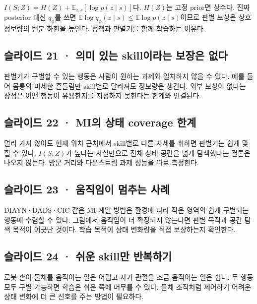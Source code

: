 \documentclass[11pt,a4paper]{article}
\begin{document}
$I(S;Z)=H(Z)+\mathbb E_{z,s}[\log p(z\mid s)]$다. $H(Z)$는 고정 prior면 상수다. 진짜 posterior 대신 $q_\phi$를 쓰면 $\mathbb E\log q_\phi(z\mid s)\le\mathbb E\log p(z\mid s)$이므로 판별 보상은 상호정보량의 변분 하한을 높인다. 정책과 판별기를 함께 학습하는 이유다.\par

\subsection{슬라이드 21 · 의미 있는 skill이라는 보장은 없다}

판별기가 구별할 수 있는 행동은 사람이 원하는 과제와 일치하지 않을 수 있다. 예를 들어 몸통의 미세한 흔들림만 skill별로 달라져도 정보량은 생긴다. 외부 보상이 없다는 장점은 어떤 행동이 유용한지를 지정하지 못한다는 한계와 연결된다.\par

\subsection{슬라이드 22 · MI의 상태 coverage 한계}

멀리 가지 않아도 현재 위치 근처에서 skill별로 다른 자세를 취하면 판별기는 쉽게 맞힐 수 있다. $I(S;Z)$가 높다는 사실만으로 전체 상태 공간을 넓게 탐색했다는 결론은 나오지 않는다. 방문 거리와 다운스트림 과제 성능을 따로 측정한다.\par

\subsection{슬라이드 23 · 움직임이 멈추는 사례}

DIAYN·DADS·CIC 같은 MI 계열 방법은 환경에 따라 작은 영역의 쉽게 구별되는 행동에 수렴할 수 있다. 그림에서 움직임이 더 확장되지 않는다면 판별 목적과 공간 탐색 목적이 어긋난 것이다. 학습 목적이 상태 변화량을 직접 보상하는지 확인한다.\par

\subsection{슬라이드 24 · 쉬운 skill만 반복하기}

로봇 손이 물체를 움직이는 일은 어렵고 자기 관절을 조금 움직이는 일은 쉽다. 두 행동 모두 구별 가능하면 학습은 쉬운 쪽에 머무를 수 있다. 물체 조작처럼 제어하기 어려운 상태 변화에 더 큰 신호를 주는 방법이 필요하다.\par
\end{document}
